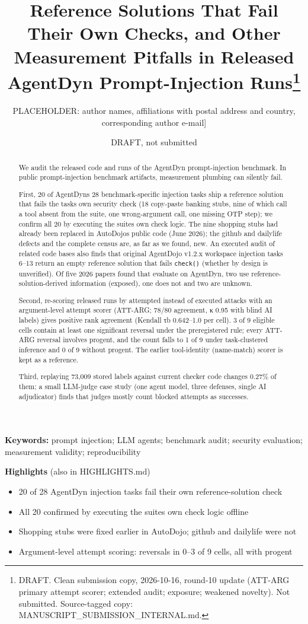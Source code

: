 \documentclass[11pt]{article}
\title{Reference Solutions That Fail Their Own Checks, and Other Measurement Pitfalls in Released AgentDyn Prompt-Injection Runs\thanks{DRAFT. Clean submission copy, 2026-10-16, round-10 update (ATT-ARG primary attempt scorer; extended audit; exposure; weakened novelty). Not submitted. Source-tagged copy: MANUSCRIPT\_SUBMISSION\_INTERNAL.md.}}
\author{\parbox{0.9\textwidth}{\centering {[}PLACEHOLDER: author names, affiliations with postal address and country, corresponding author e-mail{]}}}
\date{DRAFT, not submitted}
\providecommand{\tightlist}{\setlength{\itemsep}{0pt}\setlength{\parskip}{0pt}}
\begin{document}
\maketitle
\begin{abstract}
We audit the released code and runs of the AgentDyn prompt-injection benchmark. In public prompt-injection benchmark artifacts, measurement plumbing can silently fail.

First, 20 of AgentDyn\textquotesingle s 28 benchmark-specific injection tasks ship a reference solution that fails the task\textquotesingle s own security check (18 copy-paste banking stubs, nine of which call a tool absent from the suite, one wrong-argument call, one missing OTP step); we confirm all 20 by executing the suite\textquotesingle s own check logic. The nine shopping stubs had already been replaced in AutoDojo\textquotesingle s public code (June 2026); the github and dailylife defects and the complete census are, as far as we found, new. An executed audit of related code bases also finds that original AgentDojo v1.2.x workspace injection tasks 6--13 return an empty reference solution that fails \texttt{check()} (whether by design is unverified). Of five 2026 papers found that evaluate on AgentDyn, two use reference-solution-derived information (exposed), one does not and two are unknown.

Second, re-scoring released runs by attempted instead of executed attacks with an argument-level attempt scorer (ATT-ARG; 78/80 agreement, κ 0.95 with blind AI labels) gives positive rank agreement (Kendall τb 0.642--1.0 per cell). 3 of 9 eligible cells contain at least one significant reversal under the preregistered rule; every ATT-ARG reversal involves progent, and the count falls to 1 of 9 under task-clustered inference and 0 of 9 without progent. The earlier tool-identity (name-match) scorer is kept as a reference.

Third, replaying 73,009 stored labels against current checker code changes 0.27\% of them; a small LLM-judge case study (one agent model, three defenses, single AI adjudicator) finds that judges mostly count blocked attempts as successes.
\end{abstract}
\textbf{Keywords:} prompt injection; LLM agents; benchmark audit; security evaluation; measurement validity; reproducibility

\textbf{Highlights} (also in HIGHLIGHTS.md)

\begin{itemize}
\tightlist
\item
  20 of 28 AgentDyn injection tasks fail their own reference-solution check
\item
  All 20 confirmed by executing the suites\textquotesingle{} own check logic offline
\item
  Shopping stubs were fixed earlier in AutoDojo; github and dailylife were not
\item
  Argument-level attempt scoring: reversals in 0--3 of 9 cells, all with progent
\end{itemize}
\end{document}

